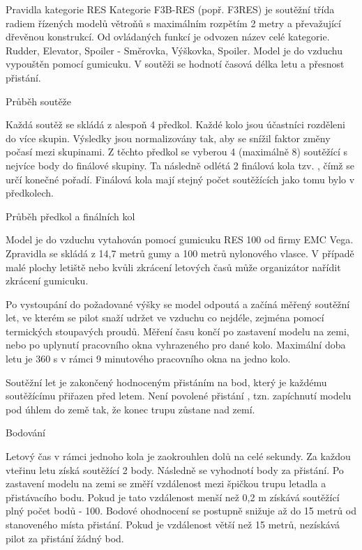 \sec Pravidla kategorie RES
Kategorie F3B-RES (popř. F3RES) je soutěžní třída radiem řízených modelů větroňů s maximálním rozpětím 2 metry a převažující dřevěnou konstrukcí. Od ovládaných funkcí je odvozen název celé kategorie. Rudder, Elevator, Spoiler - Směrovka, Výškovka, Spoiler. Model je do vzduchu vypouštěn pomocí gumicuku. V soutěži se hodnotí časová délka letu a přesnost přistání.




\secc Průběh soutěže

Každá soutěž se skládá z alespoň 4 předkol. Každé kolo jsou účastníci rozděleni do více skupin. Výsledky jsou normalizovány tak, aby se snížil faktor změny počasí mezi skupinami. Z těchto předkol se vyberou 4 (maximálně 8) soutěžící s nejvíce body do finálové skupiny. Ta následně odlétá 2 finálová kola tzv. , čímž se určí konečné pořadí. Finálová kola mají stejný počet soutěžících jako tomu bylo v předkolech.


\secc Průběh předkol a finálních kol

Model je do vzduchu vytahován pomocí gumicuku RES 100 od firmy EMC Vega. Zpravidla se skládá z 14,7 metrů gumy a 100 metrů nylonového vlasce. V případě malé plochy letiště nebo kvůli zkrácení letových časů může organizátor nařídit zkrácení gumicuku.

Po vystoupání do požadované výšky se model odpoutá a začíná měřený soutěžní let, ve kterém se pilot snaží udržet ve vzduchu co nejdéle, zejména pomocí termických stoupavých proudů. Měření času končí po zastavení modelu na zemi, nebo po uplynutí pracovního okna vyhrazeného pro dané kolo. Maximální doba letu je 360 s v rámci 9 minutového pracovního okna na jedno kolo.

Soutěžní let je zakončený hodnoceným přistáním na bod, který je každému soutěžícímu přiřazen před letem. Není povolené přistání , tzn. zapíchnutí modelu pod úhlem do země tak, že konec trupu zůstane nad zemí.


\secc Bodování

Letový čas v rámci jednoho kola je zaokrouhlen dolů na celé sekundy. Za každou vteřinu letu získá soutěžící 2 body. 
Následně se vyhodnotí body za přistání. Po zastavení modelu na zemi se změří vzdálenost mezi špičkou trupu letadla a přistávacího bodu. Pokud je tato vzdálenost menší než 0,2 m získává soutěžící plný počet bodů - 100. Bodové ohodnocení se postupně snižuje až do 15 metrů od stanoveného místa přistání. Pokud je vzdálenost větší než 15 metrů, nezískává pilot za přistání žádný bod.

